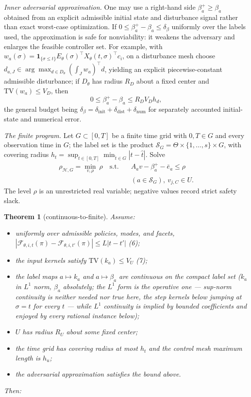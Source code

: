 \documentclass[10pt,twocolumn]{article}
\theoremstyle{plain}
\newtheorem{theorem}{Theorem}
\theoremstyle{definition}
\theoremstyle{remark}
\begin{document}
\emph{Inner adversarial approximation.} One may use a right-hand side
\(\beta_a^{+} \ge \beta_a\) obtained from an explicit admissible initial
state and disturbance signal rather than exact worst-case optimization. If
\(0 \le \beta_a^{+} - \beta_a \le \delta_\beta\) uniformly over the labels
used, the approximation is safe for nonviability: it weakens the adversary
and enlarges the feasible controller set. For example, with
\(w_a(\sigma) = \mathbf{1}_{\{\sigma \le t\}}
E_\theta(\sigma)^\top X_\theta(t,\sigma)^\top c_i\), on a disturbance mesh
choose \(d_{a,J} \in \arg\max_{d \in D_\theta} (\int_J w_a)^\top d\),
yielding an explicit piecewise-constant admissible disturbance; if
\(D_\theta\) has radius \(R_D\) about a fixed center and
\(\mathrm{TV}(w_a) \le V_D\), then
\[
0 \le \beta_a^{+} - \beta_a \le R_D V_D h_d,
\tag{4}
\]
the general budget being \(\delta_\beta = \delta_{\mathrm{init}} +
\delta_{\mathrm{dist}} + \delta_{\mathrm{num}}\) for separately accounted
initial-state and numerical error.

\emph{The finite program.} Let \(G \subset [0,T]\) be a finite time grid with \(0, T \in G\) and
every observation time in \(G\); the label set is the product
\(\mathscr{S}_G = \Theta \times \{1,\dots,s\} \times G\), with covering
radius \(h_t = \sup_{t \in [0,T]} \min_{\hat{t} \in G} |t -
\hat{t}|\). Solve
\begin{align*}
\rho_{\mathcal{H},G} = \min_{v, \rho}\ \rho
\quad \text{s.t.} \quad
& A_a v - \beta_a^{+} - \bar{e}_a \le \rho \\
& (a \in \mathscr{S}_G),
\ v_{j,C} \in U.
\tag{5}
\end{align*}
The level \(\rho\) is an unrestricted real variable; negative values record
strict safety slack.

\begin{theorem}[continuous-to-finite]\label{thm:bridge}
Assume:
\begin{itemize}\setlength\itemsep{0em}
\item[(H1)] uniformly over admissible policies, modes, and facets,
\(|\mathcal{F}_{\theta,i,t}(\pi) - \mathcal{F}_{\theta,i,t'}(\pi)| \le
L|t - t'|\) (6);
\item[(H2)] the input kernels satisfy \(\mathrm{TV}(k_a) \le V_U\) (7);
\item[(H3)] the label maps \(a \mapsto k_a\) and \(a \mapsto \beta_a\)
are continuous on the compact label set (\(k_a\) in \(L^1\) norm,
\(\beta_a\) absolutely; the \(L^1\) form is the operative one ---
sup-norm continuity is neither needed nor true here, the step kernels
below jumping at \(\sigma = t\) for every \(t\) --- while \(L^1\)
continuity is implied by bounded coefficients and enjoyed by every
rational instance below);
\item[(H4)] \(U\) has radius \(R_U\) about some fixed center;
\item[(H5)] the time grid has covering radius at most \(h_t\) and the
control mesh maximum length is \(h_u\);
\item[(H6)] the adversarial approximation satisfies the bound above.
\end{itemize}
Then:
\end{theorem}
\end{document}
